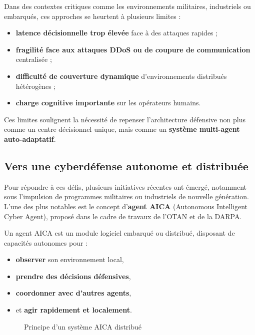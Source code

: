 \documentclass[ twoside,openright,titlepage,numbers=noenddot,headinclude,%
                footinclude=true,cleardoublepage=empty,abstractoff, %
                BCOR=5mm,paper=a4,fontsize=11pt,%
                french,american,%
                ]{scrreprt}
\begin{document}
Dans des contextes critiques comme les environnements militaires, industriels ou embarqués, ces approches se heurtent à plusieurs limites :
\begin{itemize}
    \item \textbf{latence décisionnelle trop élevée} face à des attaques rapides ;
    \item \textbf{fragilité face aux attaques DDoS ou de coupure de communication} centralisée ;
    \item \textbf{difficulté de couverture dynamique} d'environnements distribués hétérogènes ;
    \item \textbf{charge cognitive importante} sur les opérateurs humains.
\end{itemize}

Ces limites soulignent la nécessité de repenser l'architecture défensive non plus comme un centre décisionnel unique, mais comme un \textbf{système multi-agent auto-adaptatif}.

\vspace{0.5em}
\subsection*{Vers une cyberdéfense autonome et distribuée}

Pour répondre à ces défis, plusieurs initiatives récentes ont émergé, notamment sous l'impulsion de programmes militaires ou industriels de nouvelle génération. L'une des plus notables est le concept d'\textbf{agent AICA} (Autonomous Intelligent Cyber Agent), proposé dans le cadre de travaux de l'OTAN et de la DARPA.

Un agent AICA est un module logiciel embarqué ou distribué, disposant de capacités autonomes pour :
\begin{itemize}
    \item \textbf{observer} son environnement local,
    \item \textbf{prendre des décisions défensives},
    \item \textbf{coordonner avec d'autres agents},
    \item et \textbf{agir rapidement et localement}.
\end{itemize}

\begin{figure}[H]
    \centering
    \caption{Principe d'un système AICA distribué}
    \label{fig:aica-system}
\end{figure}
\end{document}

